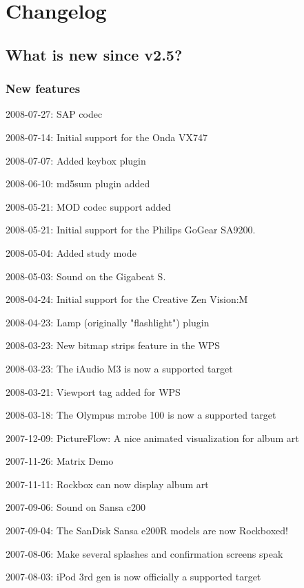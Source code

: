\chapter{\label{ref:changelog}Changelog}
\section{What is new since v2.5?}

\subsection{New features}
\begin{changelog}
\item 2008-07-27: SAP codec
\item 2008-07-14: Initial support for the Onda VX747
\item 2008-07-07: Added keybox plugin
\item 2008-06-10: md5sum plugin added
\item 2008-05-21: MOD codec support added
\item 2008-05-21: Initial support for the Philips GoGear SA9200.  
\item 2008-05-04: Added study mode
\item 2008-05-03: Sound on the Gigabeat S.
\item 2008-04-24: Initial support for the Creative Zen Vision:M
\item 2008-04-23: Lamp (originally "flashlight") plugin
\item 2008-03-23: New bitmap strips feature in the WPS
\item 2008-03-23: The iAudio M3 is now a supported target
\item 2008-03-21: Viewport tag added for WPS
\item 2008-03-18: The Olympus m:robe 100 is now a supported target
\item 2007-12-09: PictureFlow: A nice animated visualization for album art
\item 2007-11-26: Matrix Demo
\item 2007-11-11: Rockbox can now display album art
\item 2007-09-06: Sound on Sansa c200
\item 2007-09-04: The SanDisk Sansa e200R models are now Rockboxed!
\item 2007-08-06: Make several splashes and confirmation screens speak
\item 2007-08-03: iPod 3rd gen is now officially a supported target 

\end{changelog}
